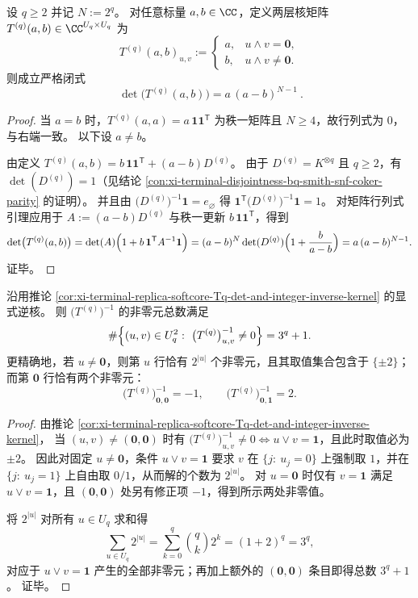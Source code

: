\begin{corollary}\label{cor:xi-terminal-replica-softcore-twolevel-kernel-det}
设 \(q\ge 2\) 并记 \(N:=2^q\)。
对任意标量 \(a,b\in\CC\)，定义两层核矩阵 \(T^{(q)}(a,b)\in\CC^{U_q\times U_q}\) 为
\[
T^{(q)}(a,b)_{u,v}:=
\begin{cases}
a,&u\wedge v=\mathbf{0},\\[2pt]
b,&u\wedge v\neq \mathbf{0}.
\end{cases}
\]
则成立严格闭式
\[
\boxed{\ \det\bigl(T^{(q)}(a,b)\bigr)=a\,(a-b)^{N-1}\ }.
\]
\end{corollary}
\begin{proof}
当 \(a=b\) 时，\(T^{(q)}(a,a)=a\,\mathbf{1}\mathbf{1}^{\mathsf T}\) 为秩一矩阵且 \(N\ge 4\)，故行列式为 \(0\)，与右端一致。
以下设 \(a\neq b\)。
\par
由定义
\(
T^{(q)}(a,b)=b\,\mathbf{1}\mathbf{1}^{\mathsf T}+(a-b)D^{(q)}
\)。
由于 \(D^{(q)}=K^{\otimes q}\) 且 \(q\ge 2\)，有 \(\det(D^{(q)})=1\)（见结论 \ref{con:xi-terminal-disjointness-bq-smith-snf-coker-parity} 的证明）。
并且由 \(\bigl(D^{(q)}\bigr)^{-1}\mathbf{1}=e_{\varnothing}\) 得
\(\mathbf{1}^{\mathsf T}\bigl(D^{(q)}\bigr)^{-1}\mathbf{1}=1\)。
对矩阵行列式引理应用于
\(
A:=(a-b)D^{(q)}
\)
与秩一更新 \(b\,\mathbf{1}\mathbf{1}^{\mathsf T}\)，得到
\[
\det\bigl(T^{(q)}(a,b)\bigr)
=\det(A)\Bigl(1+b\,\mathbf{1}^{\mathsf T}A^{-1}\mathbf{1}\Bigr)
=(a-b)^{N}\det(D^{(q)})\Bigl(1+\frac{b}{a-b}\Bigr)
=a\,(a-b)^{N-1}.
\]
证毕。
\end{proof}

\begin{corollary}\label{cor:xi-terminal-replica-softcore-inverse-support-count}
沿用推论 \ref{cor:xi-terminal-replica-softcore-Tq-det-and-integer-inverse-kernel} 的显式逆核。
则 \(\bigl(T^{(q)}\bigr)^{-1}\) 的非零元总数满足
\[
\#\Bigl\{(u,v)\in U_q^2:\ \bigl(T^{(q)}\bigr)^{-1}_{u,v}\neq 0\Bigr\}=3^q+1.
\]
更精确地，若 \(u\neq \mathbf{0}\)，则第 \(u\) 行恰有 \(2^{|u|}\) 个非零元，且其取值集合包含于 \(\{\pm 2\}\)；
而第 \(\mathbf{0}\) 行恰有两个非零元：
\[
\bigl(T^{(q)}\bigr)^{-1}_{\mathbf{0},\mathbf{0}}=-1,
\qquad
\bigl(T^{(q)}\bigr)^{-1}_{\mathbf{0},\mathbf{1}}=2.
\]
\end{corollary}
\begin{proof}
由推论 \ref{cor:xi-terminal-replica-softcore-Tq-det-and-integer-inverse-kernel}，
当 \((u,v)\neq(\mathbf{0},\mathbf{0})\) 时有
\(
\bigl(T^{(q)}\bigr)^{-1}_{u,v}\neq 0
\iff
u\vee v=\mathbf{1}
\)，且此时取值必为 \(\pm 2\)。
因此对固定 \(u\neq \mathbf{0}\)，条件 \(u\vee v=\mathbf{1}\) 要求 \(v\) 在 \(\{j:\ u_j=0\}\) 上强制取 \(1\)，并在 \(\{j:\ u_j=1\}\) 上自由取 \(0/1\)，从而解的个数为 \(2^{|u|}\)。
对 \(u=\mathbf{0}\) 时仅有 \(v=\mathbf{1}\) 满足 \(u\vee v=\mathbf{1}\)，且 \((\mathbf{0},\mathbf{0})\) 处另有修正项 \(-1\)，得到所示两处非零值。
\par
将 \(2^{|u|}\) 对所有 \(u\in U_q\) 求和得
\[
\sum_{u\in U_q}2^{|u|}
=\sum_{k=0}^{q}\binom{q}{k}2^{k}
=(1+2)^q
=3^q,
\]
对应于 \(u\vee v=\mathbf{1}\) 产生的全部非零元；再加上额外的 \((\mathbf{0},\mathbf{0})\) 条目即得总数 \(3^q+1\)。
证毕。
\end{proof}

